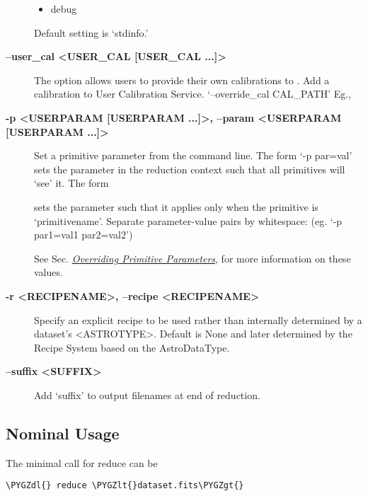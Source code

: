 \documentclass[letterpaper,10pt,english]{sphinxmanual}
\def\PYGZlt{\char`\<}
\def\PYGZgt{\char`\>}
\def\PYGZdl{\char`\$}
\begin{document}
\begin{description}
\begin{itemize}
\item {} 
debug

\end{itemize}

Default setting is `stdinfo.'

\item[{\textbf{--user\_cal \textless{}USER\_CAL {[}USER\_CAL ...{]}\textgreater{}}}] \leavevmode
The option allows users to provide their own calibrations to .
Add a calibration to User Calibration Service.
`--override\_cal CAL\_PATH'
Eg.,


\item[{\textbf{-p \textless{}USERPARAM {[}USERPARAM ...{]}\textgreater{}, --param \textless{}USERPARAM {[}USERPARAM ...{]}\textgreater{}}}] \leavevmode
Set a primitive parameter from the command line. The form `-p par=val' sets
the parameter in the reduction context such that all primitives will `see' it.
The form


sets the parameter such that it applies only when the primitive is
`primitivename'. Separate parameter-value pairs by whitespace:
(eg. `-p par1=val1 par2=val2')

See Sec. {\hyperref[interfaces:userpars]{\emph{Overriding Primitive Parameters}}}, for more information on these values.

\item[{\textbf{-r \textless{}RECIPENAME\textgreater{}, --recipe \textless{}RECIPENAME\textgreater{}}}] \leavevmode
Specify an explicit recipe to be used rather than internally determined by
a dataset's \textless{}ASTROTYPE\textgreater{}. Default is None and later determined by the Recipe
System based on the AstroDataType.

\item[{\textbf{--suffix \textless{}SUFFIX\textgreater{}}}] \leavevmode
Add `suffix' to output filenames at end of reduction.

\end{description}


\subsection{Nominal Usage}
\label{interfaces:nominal-usage}
The minimal call for reduce can be

\begin{Verbatim}[commandchars=\\\{\}]
\PYGZdl{} reduce \PYGZlt{}dataset.fits\PYGZgt{}
\end{Verbatim}
\end{document}
